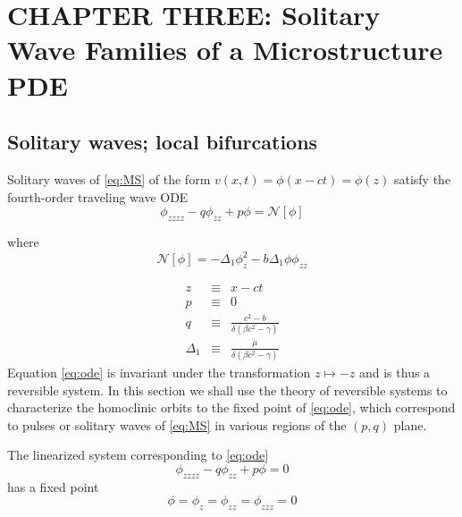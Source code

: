 \chapter{CHAPTER THREE: Solitary Wave Families of a Microstructure PDE } \label{chapter_3}

\section{Solitary waves; local bifurcations}


Solitary waves of \eqref{eq:MS} of the form 
$v(x,t) = \phi\left(x - c t\right) = \phi\left(z\right)$
 satisfy the fourth-order traveling wave ODE
\begin{equation} \label{eq:ode} \phi_{zzzz} - q \phi_{zz} + p \phi = \mathcal{N}[\phi]
\end{equation}

where 
\begin{equation}
\mathcal{N}\left[\phi\right] = -\Delta_1 \phi_z^2 - b \Delta_1 \phi \phi_{zz}
\end{equation}

\begin{subequations}
\begin{eqnarray}
z &\equiv& x - c t\\
p &\equiv& 0\label{eq:pdef} \\
q &\equiv & \frac{c^2 - b}{\delta\left(\beta c^2 - \gamma\right)} 
\label{eq:qdef} \\
\Delta_1 &\equiv& \frac{\mu}{ \delta\left( \beta c^2 - \gamma\right) }\label{eq:deltadef} 
\end{eqnarray}
\end{subequations}
Equation \eqref{eq:ode} is invariant under the transformation $ z \mapsto -z $ and is thus a reversible system. In this section we shall
use the theory of reversible systems to characterize the homoclinic orbits to the fixed point of \eqref{eq:ode}, which correspond to pulses
or solitary waves of \eqref{eq:MS} in various regions of the $(p,q)$ plane.

The linearized system corresponding to \eqref{eq:ode}
\begin{equation}
 \label{eq:linode} \phi_{zzzz} - q \phi_{zz} + p \phi = 0
\end{equation}
has a fixed point \begin{equation}\label{eq:fp} \phi = \phi_z = \phi_{zz} = \phi_{zzz} = 0 \end{equation}

